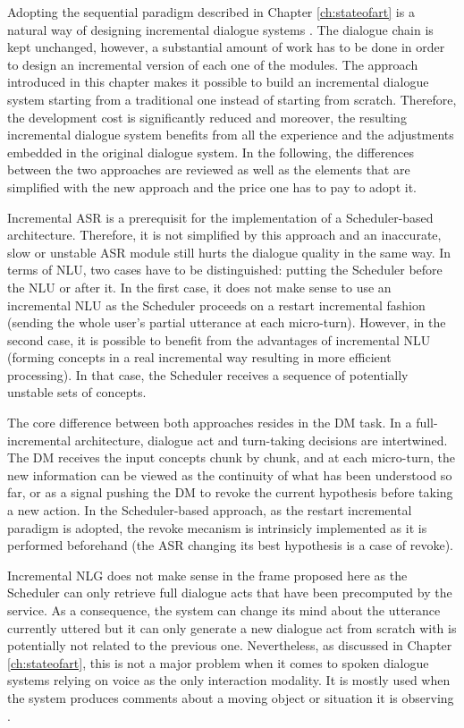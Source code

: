              Adopting the sequential paradigm described in Chapter \ref{ch:stateofart} is a natural way of designing incremental dialogue systems \cite{Schlangen2011}. The dialogue chain is kept unchanged, however, a substantial amount of work has to be done in order to design an incremental version of each one of the modules. The approach introduced in this chapter makes it possible to build an incremental dialogue system starting from a traditional one instead of starting from scratch. Therefore, the development cost is significantly reduced and moreover, the resulting incremental dialogue system benefits from all the experience and the adjustments embedded in the original dialogue system. In the following, the differences between the two approaches are reviewed as well as the elements that are simplified with the new approach and the price one has to pay to adopt it.

             Incremental ASR is a prerequisit for the implementation of a Scheduler-based architecture. Therefore, it is not simplified by this approach and an inaccurate, slow or unstable ASR module still hurts the dialogue quality in the same way. In terms of NLU, two cases have to be distinguished: putting the Scheduler before the NLU or after it. In the first case, it does not make sense to use an incremental NLU as the Scheduler proceeds on a restart incremental fashion (sending the whole user's partial utterance at each micro-turn). However, in the second case, it is possible to benefit from the advantages of incremental NLU (forming concepts in a real incremental way resulting in more efficient processing). In that case, the Scheduler receives a sequence of potentially unstable sets of concepts.

             The core difference between both approaches resides in the DM task. In a full-incremental architecture, dialogue act and turn-taking decisions are intertwined. The DM receives the input concepts chunk by chunk, and at each micro-turn, the new information can be viewed as the continuity of what has been understood so far, or as a signal pushing the DM to revoke the current hypothesis before taking a new action. In the Scheduler-based approach, as the restart incremental paradigm is adopted, the revoke mecanism is intrinsicly implemented as it is performed beforehand (the ASR changing its best hypothesis is a case of revoke).

             Incremental NLG does not make sense in the frame proposed here as the Scheduler can only retrieve full dialogue acts that have been precomputed by the service. As a consequence, the system can change its mind about the utterance currently uttered but it can only generate a new dialogue act from scratch with is potentially not related to the previous one. Nevertheless, as discussed in Chapter \ref{ch:stateofart}, this is not a major problem when it comes to spoken dialogue systems relying on voice as the only interaction modality. It is mostly used when the system produces comments about a moving object or situation it is observing \cite{Baumann2013}.


